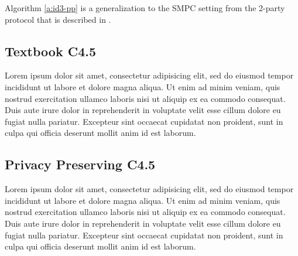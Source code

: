 Algorithm \ref{a:id3-pp} is a generalization to the SMPC setting from the 2\hyp party protocol that is described in \cite{lindell2000privacy}.


\subsection{Textbook C4.5}\label{s:c45}
Lorem ipsum dolor sit amet, consectetur adipisicing elit, sed do eiusmod tempor incididunt ut labore et dolore magna aliqua. Ut enim ad minim veniam, quis nostrud exercitation ullamco laboris nisi ut aliquip ex ea commodo consequat. Duis aute irure dolor in reprehenderit in voluptate velit esse cillum dolore eu fugiat nulla pariatur. Excepteur sint occaecat cupidatat non proident, sunt in culpa qui officia deserunt mollit anim id est laborum.

\subsection{Privacy Preserving C4.5}\label{s:pp-c45}
Lorem ipsum dolor sit amet, consectetur adipisicing elit, sed do eiusmod tempor incididunt ut labore et dolore magna aliqua. Ut enim ad minim veniam, quis nostrud exercitation ullamco laboris nisi ut aliquip ex ea commodo consequat. Duis aute irure dolor in reprehenderit in voluptate velit esse cillum dolore eu fugiat nulla pariatur. Excepteur sint occaecat cupidatat non proident, sunt in culpa qui officia deserunt mollit anim id est laborum.


